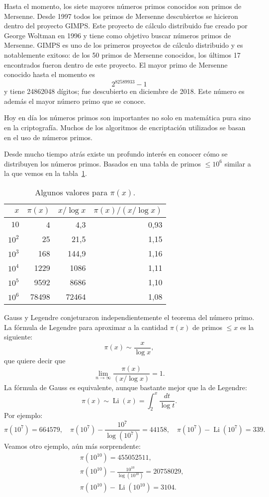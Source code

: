 Hasta el momento, los siete mayores números primos conocidos son primos de Mersenne. 
Desde 1997 todos los primos de Mersenne descubiertos se hicieron dentro del
proyecto GIMPS. Este proyecto de cálculo distribuido fue creado por George
Woltman en 1996 y tiene como objetivo buscar números primos de Mersenne. GIMPS
es uno de los primeros proyectos de cálculo distribuido y es notablemente
exitoso: de los 50 primos de Mersenne conocidos, los últimos 17 encontrados
fueron dentro de este proyecto.  El mayor primo de Mersenne conocido hasta el
momento es 
\[
	2^{82589933}-1
\]
y tiene 24862048 dígitos; fue descubierto en diciembre de 2018. Este número es
además el mayor número primo que se conoce. 

Hoy en día los números primos son importantes no solo en matemática pura sino
en la criptografía. Muchos de los algoritmos de encriptación utilizados se
basan en el uso de números primos. 

Desde mucho tiempo atrás existe un profundo interés en conocer cómo se
distribuyen los números primos. Basados en una tabla de primos $\leq10^6$
similar a la que vemos en la tabla~\ref{tab:pi}.

\begin{table}[h!]
  \begin{center}
    \caption{Algunos valores para $\pi(x)$.}
    \label{tab:pi}
    \begin{tabular}{r|r|r|r} 
	  \hline
	  $x$ & $\pi(x)$ & $x/\log x$ & $\pi(x)/(x/\log x)$\\
      \hline
	  $10$ & 4 & 4,3 & 0,93\\
	  $10^2$ & 25 & 21,5 & 1,15\\
	  $10^3$ & 168 & 144,9 & 1,16\\
	  $10^4$ & 1229 & 1086 & 1,11\\
	  $10^5$ & 9592 & 8686 & 1,10\\
	  $10^6$ & 78498& 72464 & 1,08\\
	  \hline
    \end{tabular}
  \end{center}
\end{table}

Gauss y Legendre conjeturaron independientemente el teorema del número primo.
La fórmula de Legendre para aproximar a la cantidad $\pi(x)$ de primos $\leq x$
es la siguiente:
\[
	\pi(x)\sim \frac{x}{\log x},
\]
que quiere decir que 
\[
	\lim_{n\to\infty} \frac{\pi(x)}{(x/\log x)}=1.
\]
La fórmula de Gauss es equivalente, aunque bastante mejor que la de Legendre: 
\[
	\pi(x)\sim\operatorname{Li}(x)=\int_2^x\frac{dt}{\log t}.
\]
Por ejemplo:
\[
	\pi(10^7)=664579,\quad
	\pi(10^7)-\frac{10^7}{\log(10^7)}=44158,\quad
	\pi(10^7)-\operatorname{Li}(10^7)=339.
\]
Veamos otro ejemplo, aún más sorprendente: 
\begin{align*}
	&\pi(10^{10})=455052511,\\
	&\pi(10^{10})-\frac{10^{10}}{\log (10^{10})}=20758029,\\
	&\pi(10^{10})-\operatorname{Li}(10^{10})=3104.
\end{align*}


